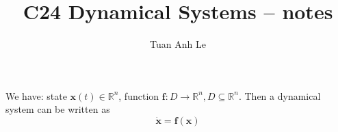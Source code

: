 \documentclass{report}
\title{C24 Dynamical Systems -- notes}
\author{Tuan Anh Le}
\renewcommand{\vec}[1]{\boldsymbol{\mathbf{#1}}}
\begin{document}
\maketitle



We have: state $\vec x(t) \in \mathbb R^n$, function $\vec f: D \to \mathbb R^n, D \subseteq \mathbb R^n$. Then a dynamical system can be written as
\begin{equation}
	\vec{\dot x} = \vec f(\vec x)
\end{equation}
\end{document}
